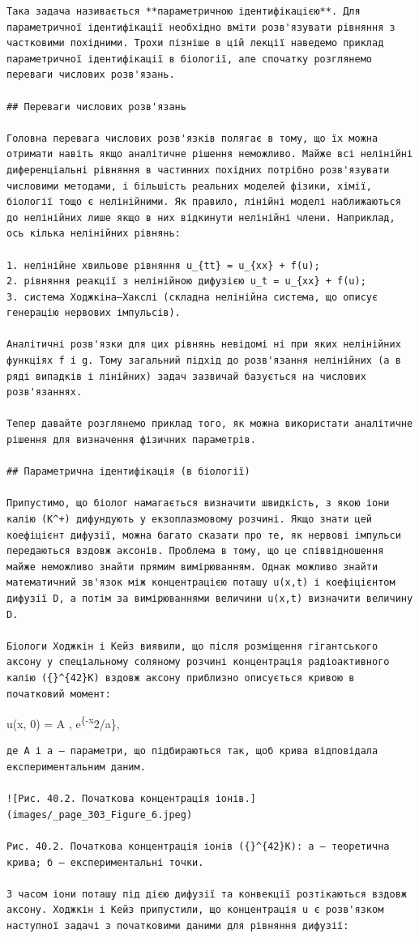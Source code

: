 \documentclass[
  ukrainian,
]{article}
\begin{document}
\begin{verbatim}
Така задача називається **параметричною ідентифікацією**. Для параметричної ідентифікації необхідно вміти розв'язувати рівняння з частковими похідними. Трохи пізніше в цій лекції наведемо приклад параметричної ідентифікації в біології, але спочатку розглянемо переваги числових розв'язань.

## Переваги числових розв'язань

Головна перевага числових розв'язків полягає в тому, що їх можна отримати навіть якщо аналітичне рішення неможливо. Майже всі нелінійні диференціальні рівняння в частинних похідних потрібно розв'язувати числовими методами, і більшість реальних моделей фізики, хімії, біології тощо є нелінійними. Як правило, лінійні моделі наближаються до нелінійних лише якщо в них відкинути нелінійні члени. Наприклад, ось кілька нелінійних рівнянь:

1. нелінійне хвильове рівняння u_{tt} = u_{xx} + f(u);
2. рівняння реакції з нелінійною дифузією u_t = u_{xx} + f(u);
3. система Ходжкіна–Хакслі (складна нелінійна система, що описує генерацію нервових імпульсів).

Аналітичні розв'язки для цих рівнянь невідомі ні при яких нелінійних функціях f і g. Тому загальний підхід до розв'язання нелінійних (а в ряді випадків і лінійних) задач зазвичай базується на числових розв'язаннях.

Тепер давайте розглянемо приклад того, як можна використати аналітичне рішення для визначення фізичних параметрів.

## Параметрична ідентифікація (в біології)

Припустимо, що біолог намагається визначити швидкість, з якою іони калію (K^+) дифундують у екзоплазмовому розчині. Якщо знати цей коефіцієнт дифузії, можна багато сказати про те, як нервові імпульси передаються вздовж аксонів. Проблема в тому, що це співвідношення майже неможливо знайти прямим вимірюванням. Однак можливо знайти математичний зв'язок між концентрацією поташу u(x,t) і коефіцієнтом дифузії D, а потім за вимірюваннями величини u(x,t) визначити величину D.

Біологи Ходжкін і Кейз виявили, що після розміщення гігантського аксону у спеціальному соляному розчині концентрація радіоактивного калію ({}^{42}K) вздовж аксону приблизно описується кривою в початковий момент:
\end{verbatim}

u(x, 0) = A , e\textsuperscript{\{-x}2/a\},

\begin{verbatim}
де A і a — параметри, що підбираються так, щоб крива відповідала експериментальним даним.

![Рис. 40.2. Початкова концентрація іонів.](images/_page_303_Figure_6.jpeg)

Рис. 40.2. Початкова концентрація іонів ({}^{42}K): а — теоретична крива; б — експериментальні точки.

З часом іони поташу під дією дифузії та конвекції розтікаються вздовж аксону. Ходжкін і Кейз припустили, що концентрація u є розв'язком наступної задачі з початковими даними для рівняння дифузії:
\end{verbatim}
\end{document}
